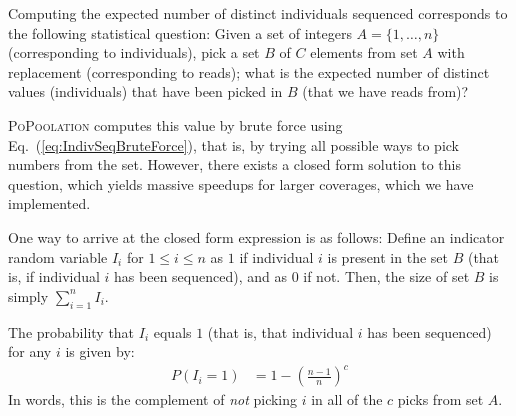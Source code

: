\documentclass[letterpaper,fontsize=9pt,DIV=12]{scrartcl}
\newcounter{popoolissue}
\newcommand\popoolissue[1]{}
\newcommand\toolname{\textsc}
\newcommand\eqnref[1]{Eq.~(\ref{#1})}
\newcommand{\coverage}{c}
\begin{document}
\popoolissue{We think that there is either an error here, or a bug in the code. The code in PoPoolation actually uses the minimum of coverage and pool size in the above, instead of the maximum as stated above, see \href{https://github.com/lczech/popoolation/blob/092e7a6f7ee4910c1bec4377e0adccc353175bc8/Modules/VarMath.pm\#L156}{here}. We are not sure which one is correct though, or what the implications of this are.}

\popoolissue{Furthermore, the original equations document states that ``$\tilde{n}$ is obtained averaging $\tilde{n}$ over the window W'', which we also stated above. However, looking at the code \href{https://github.com/lczech/popoolation/blob/092e7a6f7ee4910c1bec4377e0adccc353175bc8/Modules/VarMath.pm\#L127}{here}, there is no averaging over the window, and instead it's just computed once. The function for averaging exists in the same PoPoolation function as well, see \href{https://github.com/lczech/popoolation/blob/092e7a6f7ee4910c1bec4377e0adccc353175bc8/Modules/VarMath.pm\#L117-L125}{here}, but is commented out, and also contains a bug, as \texttt{\$cov} is not used. We are unsure how much averaging over the window vs just one value actually changes the results, and hence wanted to bring it up here.} 

Computing the expected number of distinct individuals sequenced corresponds to the following statistical question:
Given a set of integers $A = \{1, \ldots, n\}$ (corresponding to individuals),
pick a set $B$ of $C$ elements from set $A$ with replacement (corresponding to reads);
what is the expected number of distinct values (individuals) that have been picked in $B$ (that we have reads from)?

\toolname{PoPoolation} computes this value by brute force using \eqnref{eq:IndivSeqBruteForce},
that is, by trying all possible ways to pick numbers from the set.
However, there exists a closed form solution to this question, which yields massive speedups for larger coverages, which we have implemented.

One way to arrive at the closed form expression is as follows:
Define an indicator random variable $I_i$ for $1 \leq i \leq n$ as $1$
if individual $i$ is present in the set $B$ (that is, if individual $i$ has been sequenced), and as $0$ if not.
Then, the size of set $B$ is simply $\sum_{i=1}^{n} I_i$.

The probability that $I_i$ equals $1$ (that is, that individual $i$ has been sequenced)
for any $i$ is given by:
%
\begin{align}
    P(I_i = 1) &= 1-\left( \frac{n-1}{n} \right)^\coverage
\end{align}
%
In words, this is the complement of \emph{not} picking $i$ in all of the $\coverage$ picks from set $A$.
\end{document}
